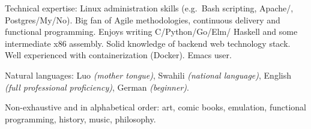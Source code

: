 \documentclass[10pt,a4paper]{article}
\begin{document}
\spacedhrule{0.5em}{-0.4em}


\inlineheadsection  %
  {Technical expertise:}
  {Linux administration skills (e.g.\ Bash scripting,
    Apache/, Postgres/My/No). Big
    fan of Agile methodologies, continuous delivery and functional
    programming.  Enjoys writing C/\nsp Python/\nsp Go/\nsp Elm/\nsp
    Haskell and some intermediate x86 assembly.  Solid knowledge of backend web technology stack. Well
    experienced with containerization (Docker).  Emacs user.
  }

\vspace{0.5em}
\inlineheadsection
  {Natural languages:}
  {Luo \emph{(mother tongue)}, Swahili \emph{(national language)}, English \emph{(full professional proficiency)}, German \emph{(beginner)}.}


\spacedhrule{1.6em}{-0.4em}


\inlineheadsection
  {Non-exhaustive and in alphabetical order:}
  {art, comic books, emulation, functional programming, history, music, philosophy.}
\end{document}
